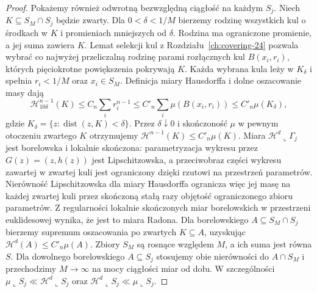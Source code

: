 \begin{proof}
Pokażemy również odwrotną bezwzględną ciągłość
na każdym $S_j$. Niech
$K\subseteq S_M\cap S_j$ będzie zwarty.
Dla $0<\delta<1/M$ bierzemy rodzinę wszystkich
kul o środkach w $K$ i promieniach mniejszych
od $\delta$. Rodzina ma ograniczone promienie,
a jej suma zawiera $K$. Lemat selekcji kul z
Rozdziału~\ref{ch:covering-24} pozwala wybrać
co najwyżej przeliczalną rodzinę parami rozłącznych
kul $B(x_i,r_i)$, których pięciokrotne powiększenia
pokrywają $K$. Każda wybrana kula leży w $K_\delta$
i spełnia $r_i<1/M$ oraz $x_i\in S_M$.
Definicja miary Hausdorffa i dolne oszacowanie
masy dają
\[
 \mathcal H^{n-1}_{10\delta}(K)
 \le C_n\sum_i r_i^{n-1}
 \le C'_n\sum_i\mu(B(x_i,r_i))
 \le C'_n\mu(K_\delta),
\]
gdzie $K_\delta=\{z:\operatorname{dist}(z,K)<\delta\}$.
Przez $\delta\downarrow0$ i skończoność
$\mu$ w pewnym otoczeniu zwartego $K$
otrzymujemy $\mathcal H^{n-1}(K)\le C'_n\mu(K)$.
Miara $\mathcal H^d\llcorner\Gamma_j$ jest
borelowska i lokalnie skończona: parametryzacja
wykresu przez $G(z)=(z,h(z))$ jest Lipschitzowska,
a przeciwobraz części wykresu zawartej w zwartej
kuli jest ograniczony dzięki rzutowi na przestrzeń
parametrów. Nierówność Lipschitzowska dla miary
Hausdorffa ogranicza więc jej masę na każdej
zwartej kuli przez skończoną stałą razy objętość
ograniczonego zbioru parametrów. Z regularności
lokalnie skończonych miar borelowskich w przestrzeni
euklidesowej wynika, że jest to miara Radona.
Dla borelowskiego $A\subseteq S_M\cap S_j$
bierzemy supremum oszacowania po zwartych
$K\subseteq A$, uzyskując
$\mathcal H^d(A)\le C'_n\mu(A)$.
Zbiory $S_M$ są rosnące względem $M$, a ich suma
jest równa $S$. Dla dowolnego borelowskiego
$A\subseteq S_j$ stosujemy obie nierówności
do $A\cap S_M$ i przechodzimy $M\to\infty$
na mocy ciągłości miar od dołu. W szczególności
$\mu\llcorner S_j\ll\mathcal H^d\llcorner S_j$
oraz $\mathcal H^d\llcorner S_j\ll\mu\llcorner S_j$.


\end{proof}
